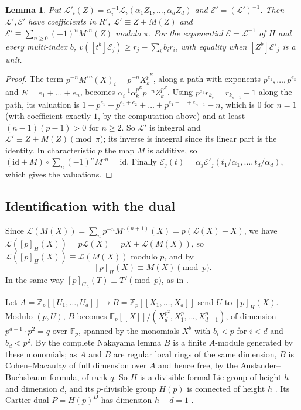 \documentclass[11pt]{amsart}
\newtheorem{lemma}[thm]{Lemma}
\theoremstyle{definition}
\theoremstyle{remark}
\newcommand{\Z}{\mathbb Z}
\newcommand{\F}{\mathbb F}
\begin{document}
\begin{lemma}\label{lem:dualscale}
Put $\mathcal L'_i(Z)=\alpha_i^{-1}\mathcal L_i(\alpha_1Z_1,\dots,\alpha_dZ_d)$ and $\mathcal E'=(\mathcal L')^{-1}$. Then $\mathcal L',\mathcal E'$ have coefficients in $R'$, $\mathcal L'\equiv Z+M(Z)$ and $\mathcal E'\equiv\sum_{n\ge0}(-1)^nM^{\circ n}(Z)$ modulo $\pi$. For the exponential $\mathcal E=\mathcal L^{-1}$ of $H$ and every multi-index $b$, $v([t^b]\mathcal E_j)\ge r_j-\sum_ib_ir_i$, with equality when $[Z^b]\mathcal E'_j$ is a unit.
\end{lemma}

\begin{proof}
The term $p^{-n}M^{\circ n}(X)_i=p^{-n}X_k^{p^E}$, along a path with exponents $p^{e_1},\dots,p^{e_n}$ and $E=e_1+\dots+e_n$, becomes $\alpha_i^{-1}\alpha_k^{p^E}p^{-n}Z_k^{p^E}$. Using $p^{e_s}r_{k_s}=r_{k_{s-1}}+1$ along the path, its valuation is $1+p^{e_1}+p^{e_1+e_2}+\dots+p^{e_1+\dots+e_{n-1}}-n$, which is $0$ for $n=1$ (with coefficient exactly $1$, by the computation above) and at least $(n-1)(p-1)>0$ for $n\ge2$. So $\mathcal L'$ is integral and $\mathcal L'\equiv Z+M(Z)\pmod\pi$; its inverse is integral since its linear part is the identity. In characteristic $p$ the map $M$ is additive, so $(\mathrm{id}+M)\circ\sum_n(-1)^nM^{\circ n}=\mathrm{id}$. Finally $\mathcal E_j(t)=\alpha_j\mathcal E'_j(t_1/\alpha_1,\dots,t_d/\alpha_d)$, which gives the valuations.
\end{proof}

\subsection{Identification with the dual}
Since $\mathcal L(M(X))=\sum_np^{-n}M^{\circ(n+1)}(X)=p(\mathcal L(X)-X)$, we have $\mathcal L([p]_H(X))=p\mathcal L(X)=pX+\mathcal L(M(X))$, so $\mathcal L([p]_H(X))\equiv\mathcal L(M(X))$ modulo $p$, and by \cite[(2.8), p.~75]{Hazewinkel79}
\[
 [p]_H(X)\equiv M(X)\pmod p .
\]
In the same way $[p]_{G_h}(T)\equiv T^q\pmod p$, as in \cite[(5.4)]{Hazewinkel79}.

Let $A=\Z_p[[U_1,\dots,U_d]]\to B=\Z_p[[X_1,\dots,X_d]]$ send $U$ to $[p]_H(X)$. Modulo $(p,U)$, $B$ becomes $\F_p[[X]]/(X_d^{p^2},X_1^p,\dots,X_{d-1}^p)$, of dimension $p^{d-1}\cdot p^2=q$ over $\F_p$, spanned by the monomials $X^b$ with $b_i<p$ for $i<d$ and $b_d<p^2$. By the complete Nakayama lemma $B$ is a finite $A$-module generated by these monomials; as $A$ and $B$ are regular local rings of the same dimension, $B$ is Cohen--Macaulay of full dimension over $A$ and hence free, by the Auslander--Buchsbaum formula, of rank $q$. So $H$ is a divisible formal Lie group of height $h$ and dimension $d$, and its $p$-divisible group $H(p)$ is connected of height $h$ \cite[\S2.2, Proposition 1]{Tate67}. Its Cartier dual $P=H(p)^D$ has dimension $h-d=1$ \cite[\S2.3, Proposition 3]{Tate67}.
\end{document}
